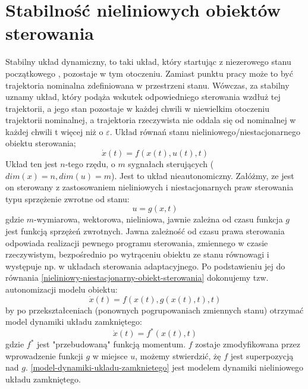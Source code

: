 \documentclass{article}
\begin{document}
	\maketitle
	\section{Stabilność nieliniowych obiektów sterowania}
		Stabilny układ dynamiczny, to taki układ, który startując z niezerowego stanu początkowego
		, pozostaje w tym otoczeniu. Zamiast punktu pracy może to być trajektoria
		nominalna zdefiniowana w przestrzeni stanu. Wówczas, za stabilny uznamy układ, który
		podąża wskutek odpowiedniego sterowania wzdłuż tej trajektorii, a jego stan pozostaje w
		każdej chwili w niewielkim otoczeniu trajektorii nominalnej, a trajektoria rzeczywista nie oddala
		się od nominalnej w każdej chwili t więcej niż o $\varepsilon$.
		Układ równań stanu nieliniowego/niestacjonarnego obiektu sterowania;
		\begin{equation}
			\dot{x}(t) = f(x(t), u(t), t)
			\label{nieliniowy-niestacjonarny-obiekt-sterowania}
		\end{equation}
		Układ ten jest $n$-tego rzędu, o $m$ sygnałach sterujących ($dim(x) = n, dim(u) = m$). Jest to układ
		nieautonomiczny. Załóżmy, ze jest on sterowany z zastosowaniem nieliniowych i
		niestacjonarnych praw sterowania typu sprzężenie zwrotne od stanu:
		\begin{equation}
			u = g(x,t)
		\end{equation}
		gdzie $m$-wymiarowa, wektorowa, nieliniowa, jawnie zależna od czasu funkcja $g$ jest funkcją
		sprzężeń zwrotnych. Jawna zależność od czasu
		prawa sterowania odpowiada realizacji pewnego programu sterowania, zmiennego w czasie
		rzeczywistym, bezpośrednio po wytrąceniu obiektu ze stanu równowagi i występuje np. w
		układach sterowania adaptacyjnego. Po podstawieniu jej do równania \eqref{nieliniowy-niestacjonarny-obiekt-sterowania}
		dokonujemy tzw. autonomizacji modelu obiektu:
		\begin{equation}
			\dot{x}(t) = f(x(t), g(x(t),t),t)
		\end{equation}
		by po przekształceniach (ponownych pogrupowaniach zmiennych stanu) otrzymać model
		dynamiki układu zamkniętego:
		\begin{equation}
			\dot{x}(t) = f^*(x(t), t)
			\label{model-dynamiki-ukladu-zamknietego}
		\end{equation}
		gdzie $f^*$ jest "przebudowaną" funkcją momentum. $f$ zostaje zmodyfikowana przez
		wprowadzenie funkcji $g$ w miejsce $u$, możemy stwierdzić, żę $f$ jest superpozycją nad $g$.
		\eqref{model-dynamiki-ukladu-zamknietego} jest modelem dynamiki nieliniowego układu zamkniętego.
\end{document}
